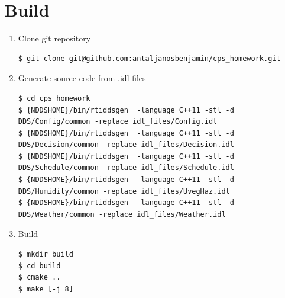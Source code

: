 \documentclass{article}
\begin{document}
\section{Build}
\begin{enumerate}
\item Clone git repository
\begin{lstlisting}
$ git clone git@github.com:antaljanosbenjamin/cps_homework.git
\end{lstlisting}
\item Generate source code from .idl files
\begin{lstlisting}
$ cd cps_homework
$ {NDDSHOME}/bin/rtiddsgen  -language C++11 -stl -d DDS/Config/common -replace idl_files/Config.idl
$ {NDDSHOME}/bin/rtiddsgen  -language C++11 -stl -d DDS/Decision/common -replace idl_files/Decision.idl
$ {NDDSHOME}/bin/rtiddsgen  -language C++11 -stl -d DDS/Schedule/common -replace idl_files/Schedule.idl
$ {NDDSHOME}/bin/rtiddsgen  -language C++11 -stl -d DDS/Humidity/common -replace idl_files/UvegHaz.idl
$ {NDDSHOME}/bin/rtiddsgen  -language C++11 -stl -d DDS/Weather/common -replace idl_files/Weather.idl
\end{lstlisting}
\item Build
\begin{lstlisting}
$ mkdir build
$ cd build
$ cmake ..
$ make [-j 8]
\end{lstlisting}
\end{enumerate}
\end{document}
